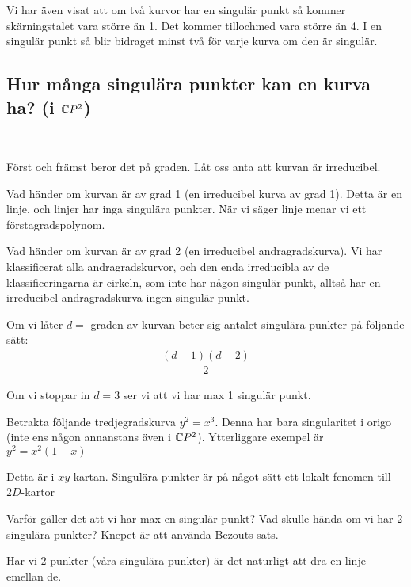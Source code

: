 \par\bigskip
\noindent Vi har även visat att om två kurvor har en singulär punkt så kommer skärningstalet vara större än 1. Det kommer tillochmed vara större än 4. I en singulär punkt så blir bidraget minst två för varje kurva om den är singulär. 
\par\bigskip
\subsection{Hur många singulära punkter kan en kurva ha? (i $\mathbb{C} P^2$)}\hfill\\\par
\noindent Först och främst beror det på graden. Låt oss anta att kurvan är irreducibel.
\par\bigskip
\noindent Vad händer om kurvan är av grad 1 (en irreducibel kurva av grad 1). Detta är en linje, och linjer har inga singulära punkter. När vi säger linje menar vi ett förstagradspolynom.
\par\bigskip
\noindent Vad händer om kurvan är av grad 2 (en irreducibel andragradskurva). Vi har klassificerat alla andragradskurvor, och den enda irreducibla av de klassificeringarna är cirkeln, som inte har någon singulär punkt, alltså har en irreducibel andragradskurva ingen singulär punkt.
\par\bigskip
\noindent Om vi låter $d=$ graden av kurvan beter sig antalet singulära punkter på följande sätt:
\begin{equation*}
  \begin{gathered}
    \dfrac{(d-1)(d-2)}{2}
  \end{gathered}
\end{equation*}
\par\bigskip
\noindent Om vi stoppar in $d=3$ ser vi att vi har max 1 singulär punkt.\par
\noindent Betrakta följande tredjegradskurva $y^2=x^3$. Denna har bara singularitet i origo (inte ens någon annanstans även i $\mathbb{C} P^2$). Ytterliggare exempel är $y^2 = x^2(1-x)$\par
\noindent Detta är i $xy$-kartan. Singulära punkter är på något sätt ett lokalt fenomen till $2D$-kartor
\par\bigskip
\noindent Varför gäller det att vi har max en singulär punkt? Vad skulle hända om vi har 2 singulära punkter? Knepet är att använda Bezouts sats.\par
\noindent Har vi 2 punkter (våra singulära punkter) är det naturligt att dra en linje emellan de.\par
